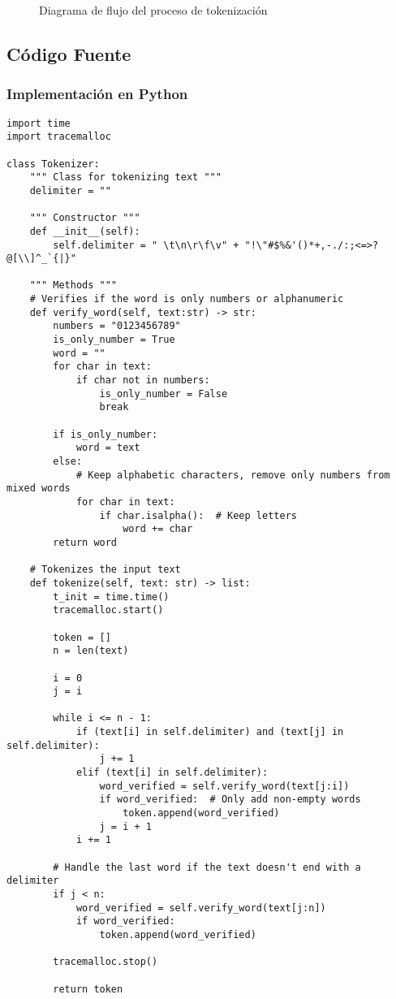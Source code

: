 \documentclass[12pt,a4paper]{article}
\begin{document}
\begin{figure}[H]
    \centering
    
    \caption{Diagrama de flujo del proceso de tokenización}
    \label{fig:diagrama_tokenizacion}
\end{figure}

\subsection{Código Fuente}

\subsubsection{Implementación en Python}

\begin{lstlisting}[caption=Clase Tokenizer en Python]
import time
import tracemalloc

class Tokenizer:
    """ Class for tokenizing text """
    delimiter = ""
    
    """ Constructor """
    def __init__(self):
        self.delimiter = " \t\n\r\f\v" + "!\"#$%&'()*+,-./:;<=>?@[\\]^_`{|}"

    """ Methods """
    # Verifies if the word is only numbers or alphanumeric
    def verify_word(self, text:str) -> str:
        numbers = "0123456789"
        is_only_number = True
        word = ""
        for char in text:
            if char not in numbers:
                is_only_number = False
                break 

        if is_only_number:
            word = text
        else:
            # Keep alphabetic characters, remove only numbers from mixed words
            for char in text:
                if char.isalpha():  # Keep letters
                    word += char
        return word
    
    # Tokenizes the input text
    def tokenize(self, text: str) -> list:              
        t_init = time.time()
        tracemalloc.start()
        
        token = []
        n = len(text)
        
        i = 0
        j = i
        
        while i <= n - 1:
            if (text[i] in self.delimiter) and (text[j] in self.delimiter):
                j += 1
            elif (text[i] in self.delimiter):
                word_verified = self.verify_word(text[j:i])
                if word_verified:  # Only add non-empty words
                    token.append(word_verified)
                j = i + 1
            i += 1

        # Handle the last word if the text doesn't end with a delimiter
        if j < n:
            word_verified = self.verify_word(text[j:n])
            if word_verified:
                token.append(word_verified)

        tracemalloc.stop()
        
        return token
\end{lstlisting}
\end{document}
